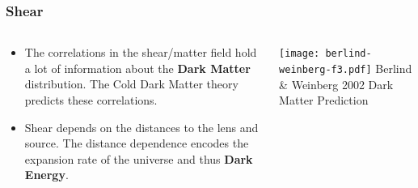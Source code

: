 \documentclass{beamer}
\begin{document}
\frame
{
    \frametitle{Shear}

    \begin{columns}
        \begin{column}{0.5\textwidth}
            \begin{itemize}


                \item The correlations in the shear/matter field hold a lot of
                    information about the {\bf Dark Matter} distribution.  The Cold Dark
                    Matter theory predicts these correlations.

                \item Shear depends on the distances to the lens and source. The
                    distance dependence encodes the expansion rate of the universe and
                    thus {\bf Dark Energy}.


            \end{itemize}
        \end{column}

        \begin{column}{0.5\textwidth}
                \texttt{[image: berlind-weinberg-f3.pdf]}
                \newline
                Berlind \& Weinberg 2002
                \newline
                Dark Matter Prediction
        \end{column}
    \end{columns}
}

\end{document}
